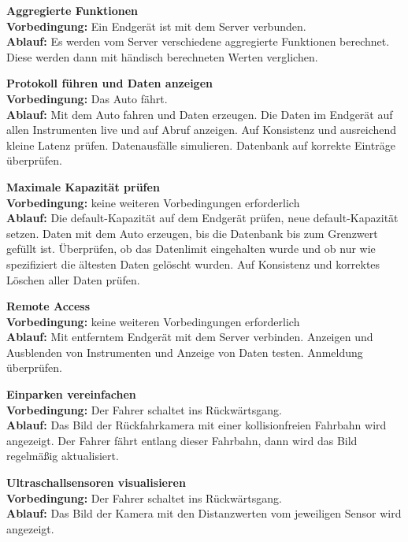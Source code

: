 \documentclass[pflichtenheft.tex]{subfiles}
\begin{document}
\begin{enumerate}
\item{\textbf{Aggregierte Funktionen}} \\
\textbf{Vorbedingung: } Ein Endgerät ist mit dem Server verbunden. \\ 
\textbf{Ablauf: } Es werden vom Server verschiedene aggregierte Funktionen berechnet. Diese werden dann mit händisch berechneten Werten verglichen.

\item{\textbf{Protokoll führen und Daten anzeigen}} \\
\textbf{Vorbedingung: } Das Auto fährt. \\
\textbf{Ablauf: } Mit dem Auto fahren und Daten erzeugen. Die Daten im Endgerät auf allen Instrumenten live und auf Abruf anzeigen. Auf Konsistenz und ausreichend kleine Latenz prüfen. Datenausfälle simulieren. Datenbank auf korrekte Einträge überprüfen.

\item{\textbf{Maximale Kapazität prüfen} \\
\textbf{Vorbedingung: } keine weiteren Vorbedingungen erforderlich \\
\textbf{Ablauf: } Die default-Kapazität auf dem Endgerät prüfen, neue default-Kapazität setzen. Daten mit dem Auto erzeugen, bis die Datenbank bis zum Grenzwert gefüllt ist. Überprüfen, ob das Datenlimit eingehalten wurde und ob nur wie spezifiziert die ältesten Daten gelöscht wurden. Auf Konsistenz und korrektes Löschen aller Daten prüfen.

\item{\textbf{Remote Access}} \\
\textbf{Vorbedingung: } keine weiteren Vorbedingungen erforderlich \\
\textbf{Ablauf: } Mit entferntem Endgerät mit dem Server verbinden. Anzeigen und Ausblenden von Instrumenten und Anzeige von Daten testen. Anmeldung überprüfen.

\item{\textbf{Einparken vereinfachen}} \\
\textbf{Vorbedingung: } Der Fahrer schaltet ins Rückwärtsgang. \\
\textbf{Ablauf: } Das Bild der Rückfahrkamera mit einer kollisionfreien
Fahrbahn wird angezeigt. Der Fahrer fährt entlang dieser Fahrbahn, dann wird das
Bild regelmäßig aktualisiert.

\item{\textbf{Ultraschallsensoren visualisieren}} \\
\textbf{Vorbedingung: } Der Fahrer schaltet ins Rückwärtsgang. \\
\textbf{Ablauf: } Das Bild der Kamera mit den Distanzwerten vom jeweiligen
Sensor wird angezeigt.

}
\end{enumerate}
\end{document}
